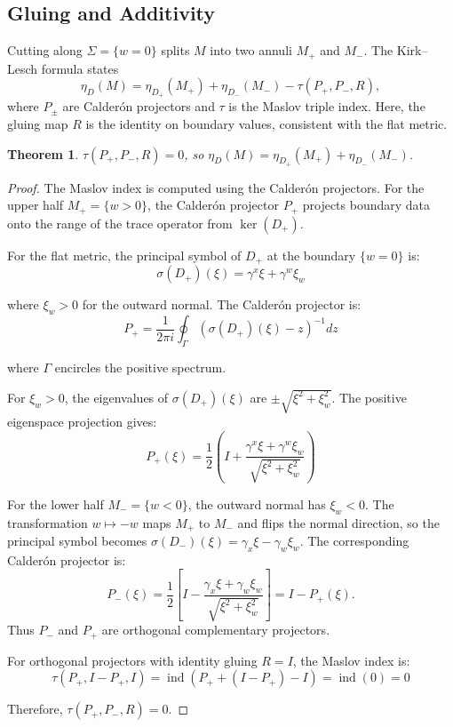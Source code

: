 \documentclass[11pt]{amsart}
\newtheorem{theorem}{Theorem}[section]
\theoremstyle{definition}
\theoremstyle{remark}
\DeclareMathOperator{\ind}{ind}
\begin{document}
\subsection{Gluing and Additivity}\label{sec:gluing}

Cutting along $\Sigma=\{w=0\}$ splits $M$ into two annuli $M_+$ and $M_-$.  The Kirk–Lesch formula states
\[
\eta_D(M) = \eta_{D_+}(M_+) + \eta_{D_-}(M_-) - \tau(P_+, P_-, R),
\]
where $P_\pm$ are Calderón projectors and $\tau$ is the Maslov triple index. Here, the gluing map $R$ is the identity on boundary values, consistent with the flat metric.

\begin{theorem}\label{thm:maslov}
$\tau(P_+, P_-, R) = 0$, so $\eta_D(M) = \eta_{D_+}(M_+) + \eta_{D_-}(M_-)$.
\end{theorem}

\begin{proof}
The Maslov index is computed using the Calderón projectors. For the upper half $M_+ = \{w > 0\}$, the Calderón projector $P_+$ projects boundary data onto the range of the trace operator from $\ker(D_+)$.

For the flat metric, the principal symbol of $D_+$ at the boundary $\{w = 0\}$ is:
\[
\sigma(D_+)(\xi) = \gamma^x \xi + \gamma^w \xi_w
\]

where $\xi_w > 0$ for the outward normal. The Calderón projector is:
\[
P_+ = \frac{1}{2\pi i} \oint_{\Gamma} (\sigma(D_+)(\xi) - z)^{-1} dz
\]

where $\Gamma$ encircles the positive spectrum.

For $\xi_w > 0$, the eigenvalues of $\sigma(D_+)(\xi)$ are $\pm\sqrt{\xi^2 + \xi_w^2}$. The positive eigenspace projection gives:
\[
P_+(\xi) = \frac{1}{2}\left(I + \frac{\gamma^x \xi + \gamma^w \xi_w}{\sqrt{\xi^2 + \xi_w^2}}\right)
\]

For the lower half $M_- = \{w < 0\}$, the outward normal has $\xi_w < 0$. The transformation $w \mapsto -w$ maps $M_+$ to $M_-$ and flips the normal direction, so the principal symbol becomes $\sigma(D_-)(\xi) = \gamma_x\xi - \gamma_w\xi_w$. The corresponding Calderón projector is:
\[
P_-(\xi) = \frac{1}{2}\left[I - \frac{\gamma_x\xi + \gamma_w\xi_w}{\sqrt{\xi^2 + \xi_w^2}}\right] = I - P_+(\xi).
\]
Thus $P_-$ and $P_+$ are orthogonal complementary projectors.

For orthogonal projectors with identity gluing $R = I$, the Maslov index is:
\[
\tau(P_+, I - P_+, I) = \ind(P_+ + (I-P_+) - I) = \ind(0) = 0
\]

Therefore, $\tau(P_+, P_-, R) = 0$.
\end{proof}
\end{document}
